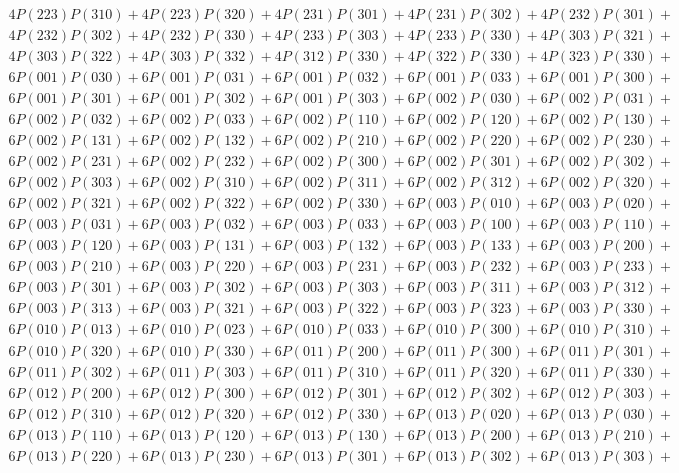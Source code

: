 \begin{align*}
	4P(223)P(310) + 4P(223)P(320) + 4P(231)P(301) + 4P(231)P(302) + 4P(232)P(301)+ \\
	4P(232)P(302) + 4P(232)P(330) + 4P(233)P(303) + 4P(233)P(330) + 4P(303)P(321)+ \\
	4P(303)P(322) + 4P(303)P(332) + 4P(312)P(330) + 4P(322)P(330) + 4P(323)P(330)+ \\
	6P(001)P(030) + 6P(001)P(031) + 6P(001)P(032) + 6P(001)P(033) + 6P(001)P(300)+ \\
	6P(001)P(301) + 6P(001)P(302) + 6P(001)P(303) + 6P(002)P(030) + 6P(002)P(031)+ \\
	6P(002)P(032) + 6P(002)P(033) + 6P(002)P(110) + 6P(002)P(120) + 6P(002)P(130)+ \\
	6P(002)P(131) + 6P(002)P(132) + 6P(002)P(210) + 6P(002)P(220) + 6P(002)P(230)+ \\
	6P(002)P(231) + 6P(002)P(232) + 6P(002)P(300) + 6P(002)P(301) + 6P(002)P(302)+ \\
	6P(002)P(303) + 6P(002)P(310) + 6P(002)P(311) + 6P(002)P(312) + 6P(002)P(320)+ \\
	6P(002)P(321) + 6P(002)P(322) + 6P(002)P(330) + 6P(003)P(010) + 6P(003)P(020)+ \\
	6P(003)P(031) + 6P(003)P(032) + 6P(003)P(033) + 6P(003)P(100) + 6P(003)P(110)+ \\
	6P(003)P(120) + 6P(003)P(131) + 6P(003)P(132) + 6P(003)P(133) + 6P(003)P(200)+ \\
	6P(003)P(210) + 6P(003)P(220) + 6P(003)P(231) + 6P(003)P(232) + 6P(003)P(233)+ \\
	6P(003)P(301) + 6P(003)P(302) + 6P(003)P(303) + 6P(003)P(311) + 6P(003)P(312)+ \\
	6P(003)P(313) + 6P(003)P(321) + 6P(003)P(322) + 6P(003)P(323) + 6P(003)P(330)+ \\
	6P(010)P(013) + 6P(010)P(023) + 6P(010)P(033) + 6P(010)P(300) + 6P(010)P(310)+ \\
	6P(010)P(320) + 6P(010)P(330) + 6P(011)P(200) + 6P(011)P(300) + 6P(011)P(301)+ \\
	6P(011)P(302) + 6P(011)P(303) + 6P(011)P(310) + 6P(011)P(320) + 6P(011)P(330)+ \\
	6P(012)P(200) + 6P(012)P(300) + 6P(012)P(301) + 6P(012)P(302) + 6P(012)P(303)+ \\
	6P(012)P(310) + 6P(012)P(320) + 6P(012)P(330) + 6P(013)P(020) + 6P(013)P(030)+ \\
	6P(013)P(110) + 6P(013)P(120) + 6P(013)P(130) + 6P(013)P(200) + 6P(013)P(210)+ \\
	6P(013)P(220) + 6P(013)P(230) + 6P(013)P(301) + 6P(013)P(302) + 6P(013)P(303)+ \\

\end{align*}
